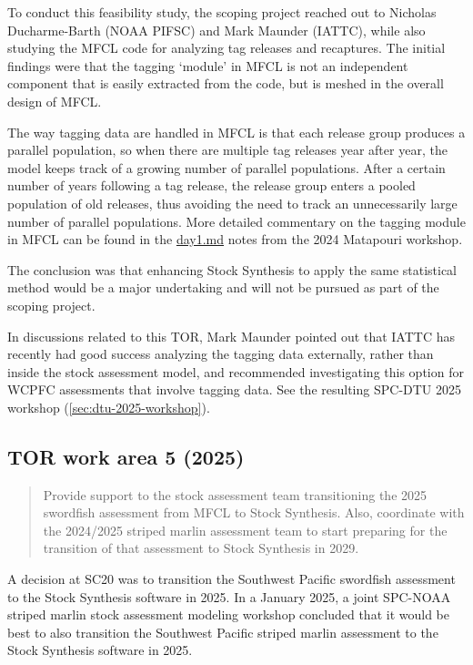 \documentclass{SCreport}
\newcommand\blob
{https://github.com/PacificCommunity/ofp-sam-transition-plan/blob/main}
\begin{document}
To conduct this feasibility study, the scoping project reached out to Nicholas
Ducharme-Barth (NOAA PIFSC) and Mark Maunder (IATTC), while also studying the
MFCL code for analyzing tag releases and recaptures. The initial findings were
that the tagging `module' in MFCL is not an independent component that is easily
extracted from the code, but is meshed in the overall design of MFCL.

The way tagging data are handled in MFCL is that each release group produces a
parallel population, so when there are multiple tag releases year after year,
the model keeps track of a growing number of parallel populations. After a
certain number of years following a tag release, the release group enters a
pooled population of old releases, thus avoiding the need to track an
unnecessarily large number of parallel populations. More detailed commentary on
the tagging module in MFCL can be found in the
\href{\blob/workshops/2024-08-matapouri/notes/day1.md}{day1.md} notes from the
2024 Matapouri workshop.

The conclusion was that enhancing Stock Synthesis to apply the same statistical
method would be a major undertaking and will not be pursued as part of the
scoping project.

In discussions related to this TOR, Mark Maunder pointed out that IATTC has
recently had good success analyzing the tagging data externally, rather than
inside the stock assessment model, and recommended investigating this option for
WCPFC assessments that involve tagging data. See the resulting SPC-DTU 2025
workshop (\autoref{sec:dtu-2025-workshop}).

\vspace{2ex}

\subsection{TOR work area 5 (2025)}

\begin{quote}\sf
  Provide support to the stock assessment team transitioning the 2025 swordfish
  assessment from MFCL to Stock Synthesis. Also, coordinate with the 2024/2025
  striped marlin assessment team to start preparing for the transition of that
  assessment to Stock Synthesis in 2029.
\end{quote}

\vspace{1ex}

A decision at SC20 was to transition the Southwest Pacific swordfish assessment
to the Stock Synthesis software in 2025. In a January 2025, a joint SPC-NOAA
striped marlin stock assessment modeling workshop concluded that it would be
best to also transition the Southwest Pacific striped marlin assessment to the
Stock Synthesis software in 2025.
\end{document}
